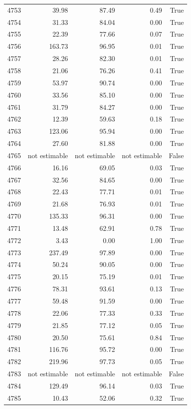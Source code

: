 \begin{longtable}{rrrrr}
4753 & 39.98 & 87.49 & 0.49 & True \\
4754 & 31.33 & 84.04 & 0.00 & True \\
4755 & 22.39 & 77.66 & 0.07 & True \\
4756 & 163.73 & 96.95 & 0.01 & True \\
4757 & 28.26 & 82.30 & 0.01 & True \\
4758 & 21.06 & 76.26 & 0.41 & True \\
4759 & 53.97 & 90.74 & 0.00 & True \\
4760 & 33.56 & 85.10 & 0.00 & True \\
4761 & 31.79 & 84.27 & 0.00 & True \\
4762 & 12.39 & 59.63 & 0.18 & True \\
4763 & 123.06 & 95.94 & 0.00 & True \\
4764 & 27.60 & 81.88 & 0.00 & True \\
4765 & not estimable & not estimable & not estimable & False \\
4766 & 16.16 & 69.05 & 0.03 & True \\
4767 & 32.56 & 84.65 & 0.00 & True \\
4768 & 22.43 & 77.71 & 0.01 & True \\
4769 & 21.68 & 76.93 & 0.01 & True \\
4770 & 135.33 & 96.31 & 0.00 & True \\
4771 & 13.48 & 62.91 & 0.78 & True \\
4772 & 3.43 & 0.00 & 1.00 & True \\
4773 & 237.49 & 97.89 & 0.00 & True \\
4774 & 50.24 & 90.05 & 0.00 & True \\
4775 & 20.15 & 75.19 & 0.01 & True \\
4776 & 78.31 & 93.61 & 0.13 & True \\
4777 & 59.48 & 91.59 & 0.00 & True \\
4778 & 22.06 & 77.33 & 0.33 & True \\
4779 & 21.85 & 77.12 & 0.05 & True \\
4780 & 20.50 & 75.61 & 0.84 & True \\
4781 & 116.76 & 95.72 & 0.00 & True \\
4782 & 219.96 & 97.73 & 0.05 & True \\
4783 & not estimable & not estimable & not estimable & False \\
4784 & 129.49 & 96.14 & 0.03 & True \\
4785 & 10.43 & 52.06 & 0.32 & True \\

\end{longtable}
